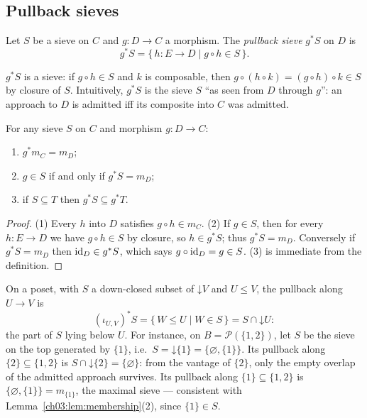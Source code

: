 \subsection{Pullback sieves}\label{ch03:sec:pullback-sieves}

\begin{definition}\label{ch03:def:pullback-sieve}
Let $S$ be a sieve on $C$ and $g : D \to C$ a morphism. The
\emph{pullback sieve} $g^* S$ on $D$ is
\[
g^* S = \{\, h : E \to D \mid g \circ h \in S \,\}.
\]
\end{definition}

$g^* S$ is a sieve: if $g \circ h \in S$ and $k$ is composable, then
$g \circ (h \circ k) = (g \circ h) \circ k \in S$ by closure of $S$.
Intuitively, $g^* S$ is the sieve $S$ ``as seen from $D$ through
$g$'': an approach to $D$ is admitted iff its composite into $C$ was
admitted.

\begin{lemma}\label{ch03:lem:membership}
For any sieve $S$ on $C$ and morphism $g : D \to C$:
\begin{enumerate}
\item $g^* m_C = m_D$;
\item $g \in S$ if and only if $g^* S = m_D$;
\item if $S \subseteq T$ then $g^* S \subseteq g^* T$.
\end{enumerate}
\end{lemma}

\begin{proof}
(1) Every $h$ into $D$ satisfies $g \circ h \in m_C$. (2) If
$g \in S$, then for every $h : E \to D$ we have
$g \circ h \in S$ by closure, so $h \in g^* S$; thus
$g^* S = m_D$. Conversely if $g^* S = m_D$ then
$\mathrm{id}_D \in g^* S$, which says $g \circ \mathrm{id}_D = g \in S$. (3) is
immediate from the definition.
\end{proof}

\begin{example}\label{ch03:ex:pullback-poset}
On a poset, with $S$ a down-closed subset of
$\mathord{\downarrow} V$ and $U \le V$, the pullback along
$U \to V$ is
\[
(\iota_{U,V})^* S = \{\, W \le U \mid W \in S \,\}
= S \cap \mathord{\downarrow} U :
\]
the part of $S$ lying below $U$. For instance, on
$B = \mathcal{P}(\{1,2\})$, let $S$ be the sieve on the top
generated by $\{1\}$, i.e.\
$S = \mathord{\downarrow} \{1\} = \{\varnothing, \{1\}\}$. Its
pullback along $\{2\} \subseteq \{1,2\}$ is
$S \cap \mathord{\downarrow} \{2\} = \{\varnothing\}$: from the
vantage of $\{2\}$, only the empty overlap of the admitted approach
survives. Its pullback along $\{1\} \subseteq \{1,2\}$ is
$\{\varnothing, \{1\}\} = m_{\{1\}}$, the maximal sieve ---
consistent with Lemma~\ref{ch03:lem:membership}(2), since
$\{1\} \in S$.
\end{example}

